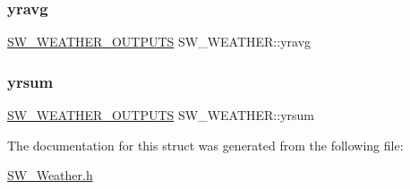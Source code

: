 \mbox{\label{struct_s_w___w_e_a_t_h_e_r_a390d116f1633413caff92d1268a9b5b0}} 
\subsubsection{\texorpdfstring{yravg}{yravg}}
{\footnotesize\ttfamily \hyperlink{struct_s_w___w_e_a_t_h_e_r___o_u_t_p_u_t_s}{S\+W\+\_\+\+W\+E\+A\+T\+H\+E\+R\+\_\+\+O\+U\+T\+P\+U\+TS} S\+W\+\_\+\+W\+E\+A\+T\+H\+E\+R\+::yravg}

\mbox{\label{struct_s_w___w_e_a_t_h_e_r_a07a5a49263519fac3a77224545c22147}} 
\subsubsection{\texorpdfstring{yrsum}{yrsum}}
{\footnotesize\ttfamily \hyperlink{struct_s_w___w_e_a_t_h_e_r___o_u_t_p_u_t_s}{S\+W\+\_\+\+W\+E\+A\+T\+H\+E\+R\+\_\+\+O\+U\+T\+P\+U\+TS} S\+W\+\_\+\+W\+E\+A\+T\+H\+E\+R\+::yrsum}



The documentation for this struct was generated from the following file\+:\begin{DoxyCompactItemize}
\item 
\hyperlink{_s_w___weather_8h}{S\+W\+\_\+\+Weather.\+h}\end{DoxyCompactItemize}
